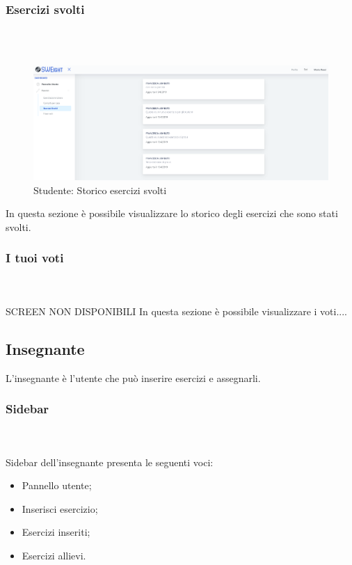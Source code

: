         \subsubsection{Esercizi svolti}\mbox{}\\ \\
        	\begin{figure}[H]
            	\centering
            	\includegraphics[width=17cm]{sez/img/studente/esercizisvolti.PNG} 
            	\caption{Studente: Storico esercizi svolti}\label{fig:1}
        	\end{figure}
          In questa sezione è possibile visualizzare  lo storico degli esercizi che sono stati svolti.
        
        
        
        
        \subsubsection{I tuoi voti}\mbox{}\\ \\
          SCREEN NON DISPONIBILI
          In questa sezione è possibile visualizzare i voti....
        
        
        
        
        
\newpage
    \subsection{Insegnante}
      L'insegnante è l'utente che può inserire esercizi e assegnarli.
        \subsubsection{Sidebar}\mbox{}\\ \\
          Sidebar dell'insegnante presenta le seguenti voci:
        	\begin{itemize}
            	\item Pannello utente;
            	\item Inserisci esercizio;
            	\item Esercizi inseriti;
            	\item Esercizi allievi.
        	\end{itemize}
        
